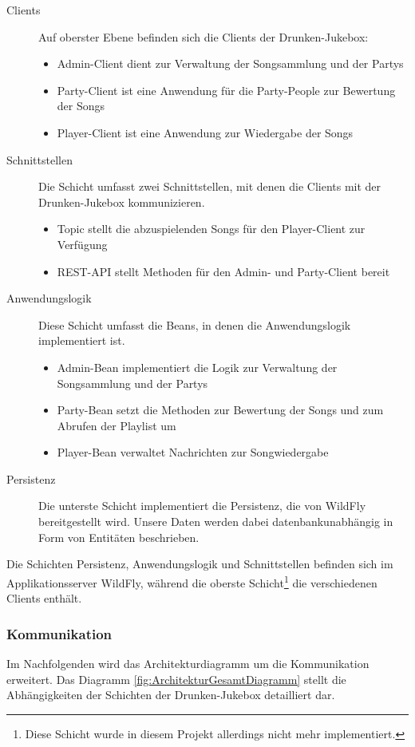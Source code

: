 \begin{description}
\item [Clients] Auf oberster Ebene befinden sich die Clients der Drunken-Jukebox:
	\begin{itemize}
	\item Admin-Client dient zur Verwaltung der Songsammlung und der Partys
	\item Party-Client ist eine Anwendung für die Party-People zur Bewertung der Songs
	\item Player-Client ist eine Anwendung zur Wiedergabe der Songs
	\end{itemize}
\item [Schnittstellen] Die Schicht umfasst zwei Schnittstellen, mit denen die Clients mit der Drunken-Jukebox kommunizieren.
	\begin{itemize}
	\item Topic stellt die abzuspielenden Songs für den Player-Client zur Verfügung
	\item REST-API stellt Methoden für den Admin- und Party-Client bereit
	\end{itemize}
\item [Anwendungslogik]Diese Schicht umfasst die Beans, in denen die Anwendungslogik implementiert ist.
	\begin{itemize}
	\item Admin-Bean implementiert die Logik zur Verwaltung der Songsammlung und der Partys
	\item Party-Bean setzt die Methoden zur Bewertung der Songs und zum Abrufen der Playlist um
	\item Player-Bean verwaltet Nachrichten zur Songwiedergabe
	\end{itemize}
\item [Persistenz] Die unterste Schicht implementiert die Persistenz, die von WildFly bereitgestellt wird. Unsere Daten werden dabei datenbankunabhängig in Form von Entitäten beschrieben.
\end{description}

Die Schichten Persistenz, Anwendungslogik und Schnittstellen befinden sich im Applikationsserver WildFly, während die oberste Schicht\footnote{Diese Schicht wurde in diesem Projekt allerdings nicht mehr implementiert.} die verschiedenen Clients enthält.

\subsubsection{Kommunikation}
Im Nachfolgenden wird das Architekturdiagramm um die Kommunikation erweitert. Das Diagramm \ref{fig:ArchitekturGesamtDiagramm} stellt die Abhängigkeiten der Schichten der Drunken-Jukebox detailliert dar.

